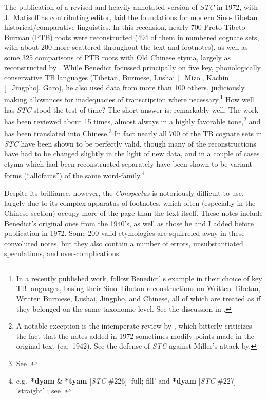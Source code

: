 The publication of a revised and heavily annotated version of \textit{STC} in 1972, with J.\ Matisoff as contributing editor, laid the foundations for modern Sino-Tibetan historical/\allowbreak{}comparative linguistics. In this recension, nearly 700 Proto-Tibeto-Burman (PTB) roots were reconstructed (494 of them in numbered cognate sets, with about 200 more scattered throughout the text and footnotes), as well as some 325 comparisons of PTB roots with Old Chinese etyma, largely as reconstructed by \citet{GSR}. While Benedict focussed principally on five key, phonologically conservative TB languages (Tibetan, Burmese, Lushai [=Mizo], Kachin [=Jingpho], Garo), he also used data from more than 100 others, judiciously making allowances for inadequacies of transcription where necessary.\footnote{In a recently published work, \citet{PS-STL} follow Benedict’ s example in their choice of key TB languages, basing their Sino-Tibetan reconstructions on Written Tibetan, Written Burmese, Lushai, Jingpho, and Chinese, all of which are treated as if they belonged on the same taxonomic level. See the discussion in \citet[ch.\ 3]{ZH-OCST98}.} How well has \textit{STC} stood the test of time? The short answer is: remarkably well. The work has been reviewed about 15 times, almost always in a highly favorable tone,\footnote{A notable exception is the intemperate review by \citet{RAM-STIC}, which bitterly criticizes the fact that the notes added in 1972 sometimes modify points made in the original text (ca.\ 1942). See the defense of \textit{STC} against Miller’s attack by\citet{JAM-BST}.} and has been translated into Chinese.\footnote{See \citealt{HZYG}.} In fact nearly all 700 of the TB cognate sets in \textit{STC} have been shown to be perfectly valid, though many of the reconstructions have had to be changed slightly in the light of new data, and in a couple of cases etyma which had been reconstructed separately have been shown to be variant forms (“allofams”) of the same word-family.\footnote{e.g.\ \textbf{*dyam} \& \textbf{*tyam} [\textit{STC} $\#$226] ‘full; fill’ and \textbf{*dyam} [\textit{STC} $\#$227] ‘straight’ ; see \citet{JAM-USAI}.}

Despite its brilliance, however, the {\it Conspectus} is notoriously difficult to use, largely due to its complex apparatus of footnotes, which often (especially in the Chinese section) occupy more of the page than the text itself. These notes include Benedict’s original ones from the 1940’s, as well as those he and I added before publication in 1972. Some 200 valid etymologies are squirreled away in these convoluted notes, but they also contain a number of errors, unsubstantiated speculations, and over-complications.

